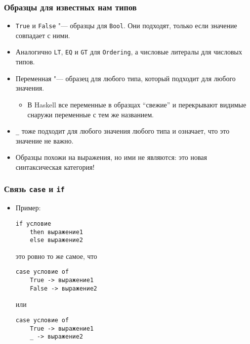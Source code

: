 \documentclass[10pt]{beamer}
\begin{document}
\begin{frame}[fragile]
\frametitle{Образцы для известных нам типов}
\begin{itemize}
    \item \lstinline|True| и \lstinline|False| "--- образцы для \lstinline|Bool|. Они подходят, только если значение совпадает с ними.
    \item Аналогично \lstinline|LT|, \lstinline|EQ| и \lstinline|GT| для \lstinline|Ordering|, а числовые литералы для числовых типов.
    \item Переменная "--- образец для любого типа, который подходит для любого значения.
    \begin{itemize}
        \item В Haskell все переменные в образцах \enquote{свежие} и перекрывают видимые снаружи переменные с тем же названием.
    \end{itemize}
\item \lstinline|_| тоже подходит для любого значения любого типа и означает, что это значение не важно.
    \item Образцы похожи на выражения, но ими не являются: это новая синтаксическая категория!
\end{itemize}
\end{frame}

\begin{frame}[fragile]
\frametitle{Связь \lstinline[basicstyle=\ttfamily]|case| и \lstinline[basicstyle=\ttfamily]|if|}
\begin{itemize}
    \item Пример:
\begin{lstlisting}
if условие 
    then выражение1 
    else выражение2
\end{lstlisting}
это ровно то же самое, что
\begin{lstlisting}
case условие of
    True -> выражение1 
    False -> выражение2
\end{lstlisting}
или
\begin{lstlisting}
case условие of
    True -> выражение1 
    _ -> выражение2
\end{lstlisting}
\end{itemize}
\end{frame}
\end{document}
